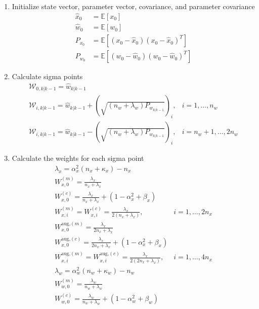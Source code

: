 \begin{enumerate}
    \item Initialize state vector, parameter vector, covariance, and parameter covariance
    \begin{align}
        \hat{x}_{0} &= \mathbb{E}[x_{0}] \\
        \hat{w}_{0} &= \mathbb{E}[w_{0}] \\
        P_{x_{0}} &= \mathbb{E}[(x_{0}-\hat{x}_{0})(x_{0}-\hat{x}_{0})^{T}] \\ 
        P_{w_{0}} &= \mathbb{E}[(w_{0}-\hat{w}_{0})(w_{0}-\hat{w}_{0})^{T}]
    \end{align}
    \item Calculate sigma points
    \begin{align}
        \mathcal{W}_{0,k|k-1} = \hat{w}_{k|k-1} \\
        \mathcal{W}_{i,k|k-1} = \hat{w}_{k|k-1} + (\sqrt{(n_{w}+\lambda_{w})P_{w_{k|k-1}}})_{i}, &  i=1,\dots,n_{w} \\
        \mathcal{W}_{i,k|k-1} = \hat{w}_{k|k-1} - (\sqrt{(n_{w}+\lambda_{w})P_{w_{k|k-1}}})_{i},  &  i=n_{w}+1,\dots,2n_{w}
    \end{align}
    \item Calculate the weights for each sigma point
    \begin{align}
        \lambda_{x} = \alpha_{x}^{2}(n_{x}+\kappa_{x})-n_{x} \\
        W^{(m)}_{x,0} = \frac{\lambda_{x}}{n_{x}+ \lambda_{x} } \\
        W^{(c)}_{x,0} = \frac{\lambda_{x}}{n_{x}+ \lambda_{x} } + (1 - \alpha^{2}_{x} + \beta_{x}) \\
        W^{(m)}_{x,i} = W^{(c)}_{x,i} = \frac{\lambda_{x}}{2(n_{x}+ \lambda_{x}) }, & i=1,\dots,2n_{x} \\
        W^{\text{aug,}(m)}_{x,0} = \frac{\lambda_{x}}{2n_{x}+ \lambda_{x} } \\
        W^{\text{aug,}(c)}_{x,0} = \frac{\lambda_{x}}{2n_{x}+ \lambda_{x} } + (1 - \alpha^{2}_{x} + \beta_{x}) \\
        W^{\text{aug,}(m)}_{x,i} = W^{\text{aug,}(c)}_{x,i} = \frac{\lambda_{x}}{2(2n_{x}+ \lambda_{x}) }, &  i=1,\dots,4n_{x} \\
        \lambda_{w} = \alpha_{w}^{2}(n_{w}+\kappa_{w})-n_{w}  \\
        W^{(m)}_{w,0} = \frac{\lambda_{w}}{n_{w}+ \lambda_{w} } \\
        W^{(c)}_{w,0} = \frac{\lambda_{w}}{n_{w}+ \lambda_{w} } + (1 - \alpha^{2}_{w} + \beta_{w} )  \\

\end{align}
\end{enumerate}
